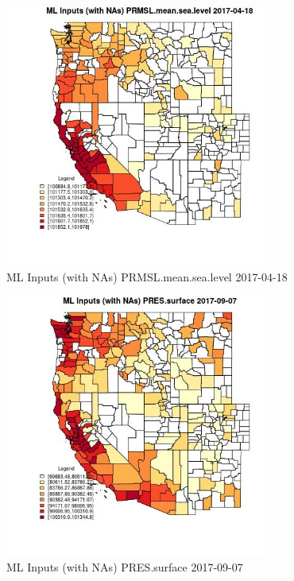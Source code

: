 \begin{figure} 
\centering  
\includegraphics[width=0.77\textwidth]{Code_Outputs/Report_ML_input_PM25_Step4_part_e_de_duplicated_aves_compiled_2019-05-21wNAs_CountyPRMSLmeansealevelMean2017-04-18.jpg} 
\caption{\label{fig:Report_ML_input_PM25_Step4_part_e_de_duplicated_aves_compiled_2019-05-21wNAsCountyPRMSLmeansealevelMean2017-04-18}ML Inputs (with NAs) PRMSL.mean.sea.level 2017-04-18} 
\end{figure} 
 

\begin{figure} 
\centering  
\includegraphics[width=0.77\textwidth]{Code_Outputs/Report_ML_input_PM25_Step4_part_e_de_duplicated_aves_compiled_2019-05-21wNAs_CountyPRESsurfaceMean2017-09-07.jpg} 
\caption{\label{fig:Report_ML_input_PM25_Step4_part_e_de_duplicated_aves_compiled_2019-05-21wNAsCountyPRESsurfaceMean2017-09-07}ML Inputs (with NAs) PRES.surface 2017-09-07} 
\end{figure} 
 

